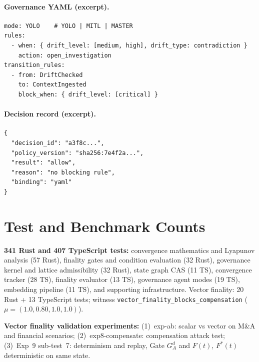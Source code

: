 \documentclass[11pt]{article}
\begin{document}
\paragraph{Governance YAML (excerpt).}
\begin{lstlisting}
mode: YOLO    # YOLO | MITL | MASTER
rules:
  - when: { drift_level: [medium, high], drift_type: contradiction }
    action: open_investigation
transition_rules:
  - from: DriftChecked
    to: ContextIngested
    block_when: { drift_level: [critical] }
\end{lstlisting}

\paragraph{Decision record (excerpt).}
\begin{lstlisting}
{
  "decision_id": "a3f8c...",
  "policy_version": "sha256:7e4f2a...",
  "result": "allow",
  "reason": "no blocking rule",
  "binding": "yaml"
}
\end{lstlisting}

\section{Test and Benchmark Counts}
\label{sec:app-tests}

\textbf{341 Rust and 407 TypeScript tests:} convergence mathematics and Lyapunov analysis (57 Rust), finality gates and condition evaluation (32 Rust), governance kernel and lattice admissibility (32 Rust), state graph CAS (11 TS), convergence tracker (28 TS), finality evaluator (13 TS), governance agent modes (19 TS), embedding pipeline (11 TS), and supporting infrastructure. Vector finality: 20 Rust + 13 TypeScript tests; witness \texttt{vector\_finality\_blocks\_compensation} ($\mu = (1.0, 0.80, 1.0, 1.0)$).

\textbf{Vector finality validation experiments:} (1)~exp-ab: scalar vs vector on M\&A and financial scenarios; (2)~exp8-compensate: compensation attack test; (3)~Exp~9 sub-test~7: determinism and replay, Gate $G_A^d$ and $F(t)$, $F^*(t)$ deterministic on same state.
\end{document}

